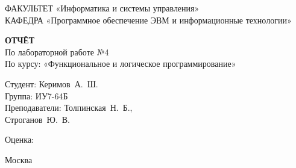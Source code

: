 \begin{titlepage}
{	{\doublespacing \small \raggedright ФАКУЛЬТЕТ \hspace{25mm} «Информатика и системы управления»\\
	КАФЕДРА \hspace{5mm} «Программное обеспечение ЭВМ и информационные технологии»\\}

	\vspace{30mm}

	\textbf{ОТЧЁТ}\\
	По лабораторной работе №4\\
	По курсу: «Функциональное и логическое программирование»\\

	\vspace{60mm}

	\hspace{70mm} Студент:       \hfill Керимов~А.~Ш.\\
	\hspace{70mm} Группа:        \hfill ИУ7-64Б\\
	\hspace{70mm} Преподаватели: \hfill Толпинская~Н.~Б.,\\
	                             \hfill Строганов~Ю.~В.\\
	{\raggedright \hspace{70mm} Оценка: \hfill \hrulefill\\}

	\vfill

	Москва\\
	\the\year\\}
\end{titlepage}
